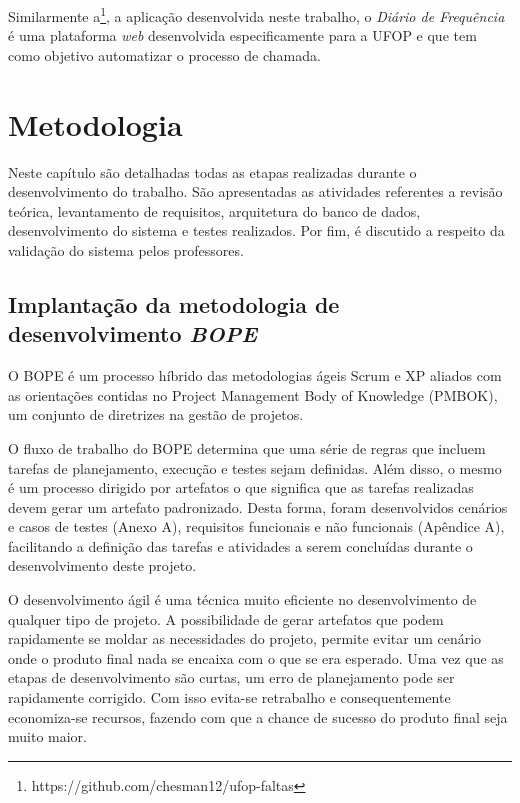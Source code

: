 \documentclass[
  12pt,       %
  openright,      %
  oneside,      %
  a4paper,      %
  english,      %
  french,        %
  spanish,     %
  brazil        %
  ]{abntex2-decsi}
\begin{document}
        Similarmente a\footnote{https://github.com/chesman12/ufop-faltas}, a aplicação desenvolvida neste trabalho, o \textit{Diário de Frequência} é uma plataforma \textit{web} desenvolvida especificamente para a UFOP e que tem como objetivo automatizar o processo de chamada. 

\chapter{Metodologia}\label{metodologia}
        Neste capítulo são detalhadas todas as etapas realizadas durante o desenvolvimento do trabalho. São apresentadas as atividades referentes a revisão teórica, levantamento de requisitos, arquitetura do banco de dados, desenvolvimento do sistema e testes realizados. Por fim, é discutido a respeito da validação do sistema pelos professores.
        
    \section{Implantação da metodologia de desenvolvimento \textit{BOPE}}
    
     O BOPE é um processo híbrido das metodologias ágeis Scrum e XP aliados com as orientações contidas no Project Management Body of Knowledge (PMBOK), um conjunto de diretrizes na gestão de projetos. %
     
	O fluxo de trabalho do BOPE\cite{PEREIRA; Senna Carneiro; PEREIRA, 2013} determina que  uma série de regras que incluem tarefas de planejamento, execução e testes sejam definidas. Além disso, o mesmo é um processo dirigido por artefatos o que significa que as tarefas realizadas devem gerar um artefato padronizado. Desta forma, foram desenvolvidos cenários e casos de testes (Anexo A), requisitos funcionais e não funcionais (Apêndice A), facilitando a definição das tarefas e atividades a serem concluídas durante o desenvolvimento
deste projeto.

	O desenvolvimento ágil é uma técnica muito eficiente no desenvolvimento de
qualquer tipo de projeto. A possibilidade de gerar artefatos que podem rapidamente se
moldar as necessidades do projeto, permite evitar um cenário onde o produto final nada se
encaixa com o que se era esperado. Uma vez que as etapas de desenvolvimento são curtas,
um erro de planejamento pode ser rapidamente corrigido. Com isso evita-se retrabalho e
consequentemente economiza-se recursos, fazendo com que a chance de sucesso do produto
final seja muito maior.
\end{document}
